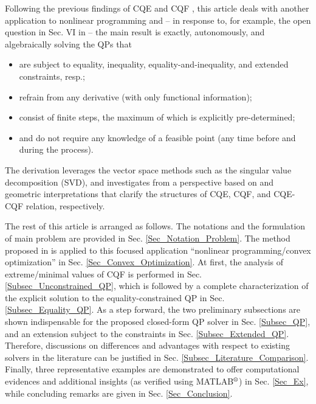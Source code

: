 \documentclass{imaman}
\numberwithin{equation}{section}
\begin{document}
Following the previous findings of CQE and CQF \citep{LiLiHs:20}, this article deals with another application to nonlinear programming and -- in response to, for example, the open question in Sec. VI in \cite{DuJoWaWi:15} -- the main result is exactly, autonomously, and algebraically solving the QPs that
\begin{itemize}
\item are subject to equality, inequality, equality-and-inequality, and extended constraints, resp.;
\item refrain from any derivative (with only functional information);
\item consist of finite steps, the maximum of which is explicitly pre-determined;
\item and do not require any knowledge of a feasible point (any time before and during the process).
\end{itemize}
The derivation leverages the vector space methods such as the singular value decomposition (SVD), and investigates from a perspective based on \cite{LiLiHs:20} and geometric interpretations that clarify the structures of CQE, CQF, and CQE-CQF relation, respectively.

The rest of this article is arranged as follows. The notations and the formulation of main problem are provided in Sec. \ref{Sec_Notation_Problem}. The method proposed in \cite{LiLiHs:20} is applied to this focused application ``nonlinear programming/convex optimization'' in Sec. \ref{Sec_Convex_Optimization}. At first, the analysis of extreme/minimal values of CQF is performed in Sec. \ref{Subsec_Unconstrained_QP}, which is followed by a complete characterization of the explicit solution to the equality-constrained QP in Sec. \ref{Subsec_Equality_QP}. As a step forward, the two preliminary subsections are shown indispensable for the proposed closed-form QP solver in Sec. \ref{Subsec_QP}, and an extension subject to the constraints in Sec. \ref{Subsec_Extended_QP}. Therefore, discussions on differences and advantages with respect to existing solvers in the literature can be justified in Sec. \ref{Subsec_Literature_Comparison}. Finally, three representative examples are demonstrated to offer computational evidences and additional insights (as verified using MATLAB$\textsuperscript{\textregistered}$) in Sec. \ref{Sec_Ex}, while concluding remarks are given in Sec. \ref{Sec_Conclusion}.
\end{document}
